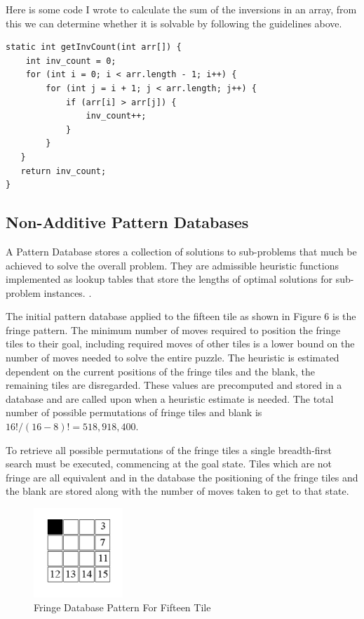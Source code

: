 \documentclass[final]{cmpreport}
\begin{document}
Here is some code I wrote to calculate the sum of the inversions in an array, from this we can determine whether it is solvable by following the guidelines above.
\begin{verbatim}
static int getInvCount(int arr[]) {
    int inv_count = 0;
    for (int i = 0; i < arr.length - 1; i++) {
        for (int j = i + 1; j < arr.length; j++) {
            if (arr[i] > arr[j]) {
                inv_count++;
            }
        }
   }
   return inv_count;
}
\end{verbatim}


\subsection{Non-Additive Pattern Databases}
A Pattern Database stores a collection of solutions to sub-problems that much be achieved to solve the overall problem. They are admissible heuristic functions implemented as lookup tables that store the lengths of optimal solutions for sub-problem instances. \citep{DBLP:journals/jair/FelnerKMH07}.

The initial pattern database applied to the fifteen tile as shown in Figure 6 is the fringe pattern. The minimum number of moves required to position the fringe tiles to their goal, including required moves of other tiles is a lower bound on the number of moves needed to solve the entire puzzle. The heuristic is estimated dependent on the current positions of the fringe tiles and the blank, the remaining tiles are disregarded. These values are precomputed and stored in a database and are called upon when a heuristic estimate is needed. The total number of possible permutations of fringe tiles and blank is $16!/(16-8)!=518,918,400$. 

To retrieve all possible permutations of the fringe tiles a single breadth-first search must be executed, commencing at the goal state. Tiles which are not fringe are all equivalent and in the database the positioning of the fringe tiles and the blank are stored along with the number of moves taken to get to that state.

\begin{figure}[ht]
	\centering
	\includegraphics[width=0.30\textwidth]{fringe}
	\captionsetup{justification=centering}
	\caption{Fringe Database Pattern For Fifteen Tile}
\end{figure}
\end{document}
